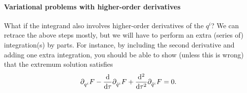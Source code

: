 \paragraph{Variational problems with higher-order derivatives}
What if the integrand also involves higher-order derivatives of the $q^{i}$? We can retrace the above steps mostly, but we will have to perform an extra (series of) integration(s) by parts. For instance, by including the second derivative and adding one extra integration, you should be able to show (unless this is wrong) that the extremum solution satisfies
\begin{align*}
	\partial^{}_{q^{i}}F - \dv{\tau}\partial^{}_{\dot{q}^{i}}F + \dv[2]{\tau}\partial^{}_{\ddot{q}^{i}}F = 0.
\end{align*}